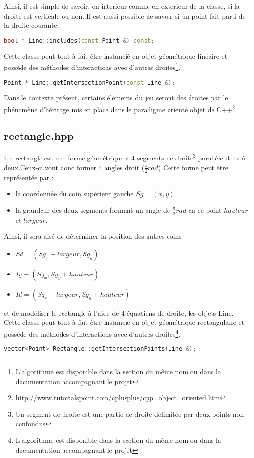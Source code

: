 \documentclass[a4paper,11pt]{report}
\begin{document}
Ainsi, il est simple de savoir, en interieur comme en exterieur de la classe, si
la droite est verticale ou non.
Il est aussi possible de savoir si un point fait parti de la droite courante.
\begin{lstlisting}[frame=single,language=C++]
bool * Line::includes(const Point &) const;
\end{lstlisting}
Cette classe peut tout à fait être instancié en objet géométrique linéaire
et possède des méthodes d'interactions avec d'autres droites\footnote{L'algorithme
	est disponible dans la section du même nom ou dans la documentation
accompagnant le projet}.
\begin{lstlisting}[frame=single,language=C++]
Point * Line::getIntersectionPoint(const Line &);
\end{lstlisting}
Dans le contexte présent, certains éléments du jeu seront des droites par le 
phénomène d'héritage mis en place dans le paradigme orienté objet de
C++\footnote{\url{http://www.tutorialspoint.com/cplusplus/cpp_object_oriented.htm}}
\subsection[Rectangle]{rectangle.hpp}
\begin{center}
\end{center}
Un rectangle est une forme géométrique à 4 segments de droite\footnote{Un
	segment de droite est une partie de droite délimitée par deux points non
confondus} 
parallèle deux à deux.Ceux-ci vont donc former 4 angles droit ($\frac{\pi}{2} rad$)
Cette forme peut être représentée par :
\begin{itemize}
	\item la coordonnée du coin supérieur gauche $Sg = (x, y)$
	\item la grandeur des deux segments formant un angle de $\frac{\pi}{2} rad$
		en ce point $hauteur$ et $largeur$.
\end{itemize}

Ainsi, il sera aisé de déterminer la position des autres coins 
\begin{itemize}
	\item $Sd = (Sg_x + largeur, Sg_y)$
	\item $Ig = (Sg_x , Sg_y + hauteur)$
	\item $Id = (Sg_x + largeur, Sg_y + hauteur)$
\end{itemize}
et de modéliser le rectangle à l'aide de 4 équations de droite, les objets Line.
Cette classe peut tout à fait être instancié en objet géométrique rectangulaire
et possède des méthodes d'interactions avec d'autres droites\footnote{L'algorithme
	est disponible dans la section du même nom ou dans la documentation
accompagnant le projet}.
\begin{lstlisting}[frame=single,language=C++]
vector<Point> Rectangle::getIntersectionPoints(Line &);
\end{lstlisting}
\end{document}
